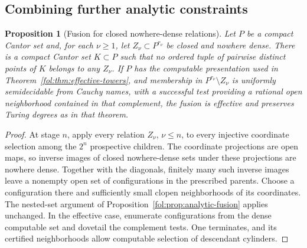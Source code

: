 \documentclass[11pt,a4paper]{article}
\newtheorem{proposition}[theorem]{Proposition}
\theoremstyle{definition}
\theoremstyle{remark}
\numberwithin{equation}{section}
\begin{document}
\subsection{Combining further analytic constraints}
\begin{proposition}[Fusion for closed nowhere-dense relations]
\label{fol:prop:closed-relation-fusion}
Let $P$ be a compact Cantor set and, for each $\nu\ge1$, let
$Z_\nu\subset P^{r_\nu}$ be closed and nowhere dense. There is a compact
Cantor set $K\subset P$ such that no ordered tuple of pairwise distinct
points of $K$ belongs to any $Z_\nu$. If $P$ has the computable
presentation used in Theorem~\ref{fol:thm:effective-towers}, and membership
in $P^{r_\nu}\setminus Z_\nu$ is uniformly semidecidable from Cauchy
names, with a successful test providing a rational open neighborhood
contained in that complement, the fusion is effective and preserves
Turing degrees as in that theorem.
\end{proposition}
\begin{proof}
At stage $n$, apply every relation $Z_\nu$, $\nu\le n$, to every
injective coordinate selection among the $2^n$ prospective children.
The coordinate projections are open maps, so inverse images of closed
nowhere-dense sets under these projections are nowhere dense. Together
with the diagonals, finitely many such inverse images leave a nonempty
open set of configurations in the prescribed parents. Choose a
configuration there and sufficiently small clopen neighborhoods of its
coordinates. The nested-set argument of
Proposition~\ref{fol:prop:analytic-fusion} applies unchanged. In the
effective case, enumerate configurations from the dense computable set
and dovetail the complement tests. One terminates, and its certified
neighborhoods allow computable selection of descendant cylinders.
\end{proof}
\end{document}
